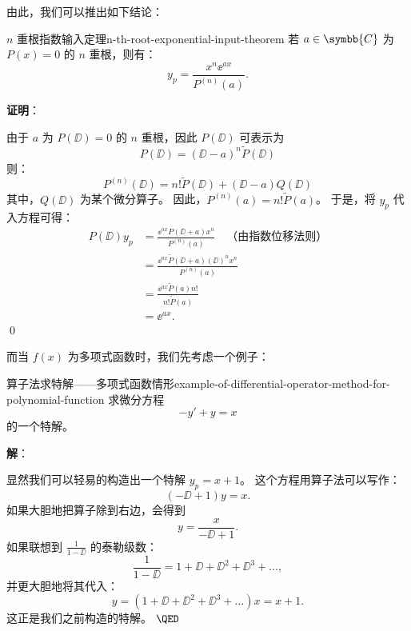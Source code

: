 由此，我们可以推出如下结论：
\begin{theorem}{$ n $ 重根指数输入定理}{n-th-root-exponential-input-theorem}
    若 $ a \in \symbb{C} $ 为 $ P(x) = 0 $ 的 $ n $ 重根，则有：
    \begin{equation}
        y_p = \frac{x^n \ee^{ax} }{P^{(n)}(a)} .
    \end{equation}

    \textbf{证明}：

    由于 $ a $ 为 $ P(\DD) = 0 $ 的 $ n $ 重根，因此 $ P(\DD) $ 可表示为
    \begin{equation*}
        P(\DD) = (\DD - a)^n \tilde{P}(\DD)
    \end{equation*}
    则：
    \begin{equation*}
        P ^{(n)} (\DD) = n! \tilde{P}(\DD) + (\DD - a) Q(\DD)
    \end{equation*}
    其中，$ Q(\DD) $ 为某个微分算子。
    因此，$ P^{(n)} (a) = n! \tilde{P}(a) $。
    于是，将 $ y_p $ 代入方程可得：
    \begin{equation*}
        \begin{aligned}
            P(\DD) y_p & = \frac{\ee^{ax} P(\DD + a) x^n }{P^{(n)}(a)} \quad \text{（由指数位移法则）} \\
                       & = \frac{\ee^{ax} \tilde{P}(\DD + a) (\DD)^n x^n }{P^{(n)}(a)}        \\
                       & = \frac{\ee^{ax} \tilde{P}(a) n! }{n! \tilde{P}(a)}                  \\
                       & = \ee^{ax} .
        \end{aligned}
    \end{equation*}
    \qed
\end{theorem}

\bigskip

而当 $ f(x) $ 为多项式函数时，我们先考虑一个例子：
\begin{example}{算子法求特解——多项式函数情形}{example-of-differential-operator-method-for-polynomial-function}
    求微分方程
    \begin{equation*}
        - y' + y = x
    \end{equation*}
    的一个特解。

    \textbf{解}：

    显然我们可以轻易的构造出一个特解 $ y_p = x + 1 $。
    这个方程用算子法可以写作：
    \begin{equation*}
        (-\DD + 1) y = x .
    \end{equation*}
    如果大胆地把算子除到右边，会得到
    \begin{equation*}
        y = \frac{x}{-\DD + 1} .
    \end{equation*}
    如果联想到 $ \frac{1}{1 - \DD} $ 的泰勒级数：
    \begin{equation*}
        \frac{1}{1 - \DD} = 1 + \DD + \DD^2 + \DD^3 + \ldots ,
    \end{equation*}
    并更大胆地将其代入：
    \begin{equation*}
        y = (1 + \DD + \DD^2 + \DD^3 + \ldots ) x = x + 1 .
    \end{equation*}
    这正是我们之前构造的特解。
    $\hfill \QED $
\end{example}

